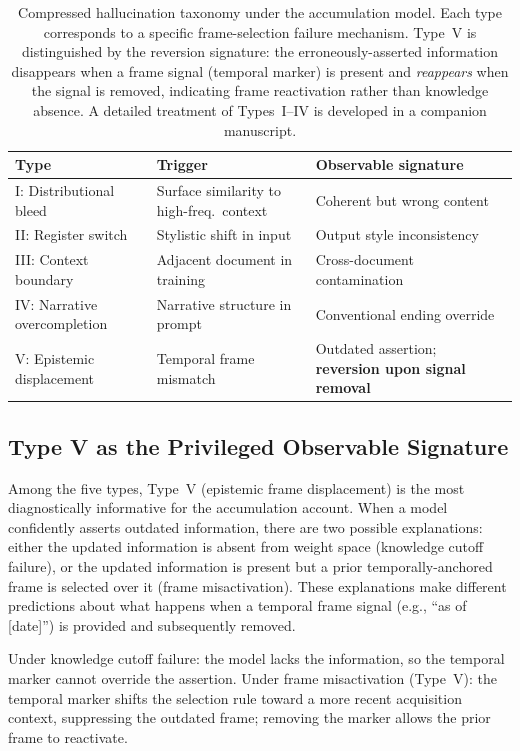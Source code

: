 \documentclass[12pt]{article}
\begin{document}
\begin{table}[ht]
\centering
\small
\begin{tabular}{lll}
\hline
Type & Trigger & Observable signature \\
\hline
I: Distributional bleed & Surface similarity to high-freq.\ context
  & Coherent but wrong content \\
II: Register switch & Stylistic shift in input
  & Output style inconsistency \\
III: Context boundary & Adjacent document in training
  & Cross-document contamination \\
IV: Narrative overcompletion & Narrative structure in prompt
  & Conventional ending override \\
V: Epistemic displacement & Temporal frame mismatch
  & Outdated assertion; \textbf{reversion upon signal removal} \\
\hline
\end{tabular}
\caption{Compressed hallucination taxonomy under the accumulation model.
Each type corresponds to a specific frame-selection failure mechanism.
Type~V is distinguished by the reversion signature: the erroneously-asserted
information disappears when a frame signal (temporal marker) is present
and \emph{reappears} when the signal is removed, indicating frame
reactivation rather than knowledge absence.
A detailed treatment of Types~I--IV is developed in a companion manuscript.}
\label{tab:taxonomy}
\end{table}

\subsection{Type V as the Privileged Observable Signature}

Among the five types, Type~V (epistemic frame displacement) is
the most diagnostically informative for the accumulation account.
When a model confidently asserts outdated information, there are
two possible explanations: either the updated information is absent
from weight space (knowledge cutoff failure), or the updated
information is present but a prior temporally-anchored frame is
selected over it (frame misactivation).
These explanations make different predictions about what happens
when a temporal frame signal (e.g., ``as of [date]'') is provided
and subsequently removed.

Under knowledge cutoff failure: the model lacks the information,
so the temporal marker cannot override the assertion.
Under frame misactivation (Type~V): the temporal marker shifts
the selection rule toward a more recent acquisition context,
suppressing the outdated frame; removing the marker allows the
prior frame to reactivate.
\end{document}
